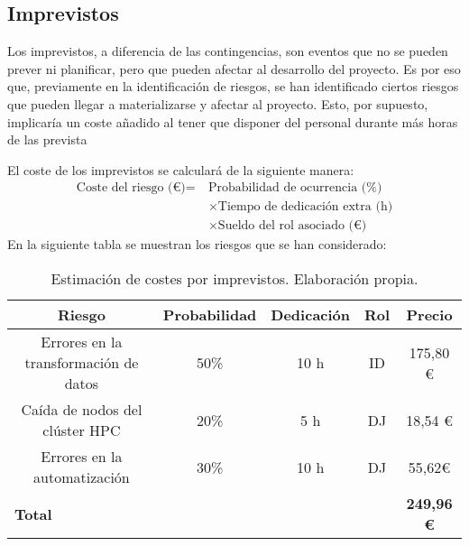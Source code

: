 \subsection{Imprevistos}

Los imprevistos, a diferencia de las contingencias, son eventos que no se pueden prever ni planificar, pero que pueden afectar al desarrollo del proyecto.
Es por eso que, previamente en la identificación de riesgos, se han identificado ciertos riesgos que pueden llegar a materializarse y afectar al proyecto.
Esto, por supuesto, implicaría un coste añadido al tener que disponer del
personal durante más horas de las prevista

El coste de los imprevistos se calculará de la siguiente manera:
\begin{align}
    \text{Coste del riesgo (€)} =\ & \text{Probabilidad de ocurrencia (\%)} \nonumber \\
    & \times \text{Tiempo de dedicación extra (h)} \nonumber \\
    & \times \text{Sueldo del rol asociado (€)}
\end{align}
En la siguiente tabla se muestran los riesgos que se han considerado:
\begin{table}[h!]
    \centering
    \begin{tabular}{|c|c|c|c|c|}
        \hline
        \textbf{Riesgo} & \textbf{Probabilidad} & \textbf{Dedicación} & \textbf{Rol} & \textbf{Precio}\\
        \hline
        Errores en la transformación de datos & 50\% & 10 h & ID & 175,80 € \\
        Caída de nodos del clúster HPC & 20\% & 5 h & DJ & 18,54 € \\
        Errores en la automatización & 30\% & 10 h &  DJ & 55,62€\\
        \hline
        \multicolumn{4}{|l|}{\textbf{Total}}  & \textbf{249,96 €} \\
        \hline
    \end{tabular}
    \caption{Estimación de costes por imprevistos. Elaboración propia.}
    \label{tab:recursos_directos}
\end{table}
